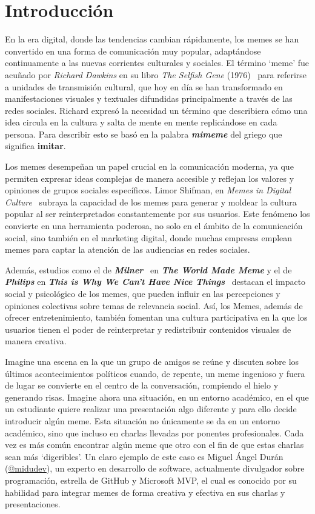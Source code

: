 \chapter{Introducción}

En la era digital, donde las tendencias cambian rápidamente, los memes se han convertido en una forma de comunicación muy popular, adaptándose continuamente a las nuevas corrientes culturales y sociales. El término `meme' fue acuñado por \textit{Richard Dawkins} en su libro \textit{The Selfish Gene} (1976)~\cite{dawkins2016selfish} para referirse a unidades de transmisión cultural, que hoy en día se han transformado en manifestaciones visuales y textuales difundidas principalmente a través de las redes sociales. Richard expresó la necesidad un término que describiera cómo una idea circula en la cultura y salta de mente en mente replicándose en cada persona. Para describir esto se basó en la palabra \textit{\textbf{mimeme}} del griego que significa \textbf{imitar}.

Los memes desempeñan un papel crucial en la comunicación moderna, ya que permiten expresar ideas complejas de manera accesible y reflejan los valores y opiniones de grupos sociales específicos. Limor Shifman, en \textit{Memes in Digital Culture}~\cite{lehman2016memes} subraya la capacidad de los memes para generar y moldear la cultura popular al ser reinterpretados constantemente por sus usuarios. Este fenómeno los convierte en una herramienta poderosa, no solo en el ámbito de la comunicación social, sino también en el marketing digital, donde muchas empresas emplean memes para captar la atención de las audiencias en redes sociales.

Además, estudios como el de \textit{\textbf{Milner}}~\cite{milner2018world} en \textit{\textbf{The World Made Meme}} y el de \textit{\textbf{Philips}} en \textit{\textbf{This is Why We Can't Have Nice Things}}~\cite{phillips2015we} destacan el impacto social y psicológico de los memes, que pueden influir en las percepciones y opiniones colectivas sobre temas de relevancia social. Así, los Memes, además de ofrecer entretenimiento, también fomentan una cultura participativa en la que los usuarios tienen el poder de reinterpretar y redistribuir contenidos visuales de manera creativa.

Imagine una escena en la que un grupo de amigos se reúne y discuten sobre los últimos acontecimientos políticos cuando, de repente, un meme ingenioso y fuera de lugar se convierte en el centro de la conversación, rompiendo el hielo y generando risas. Imagine ahora una situación, en un entorno académico, en el que un estudiante quiere realizar una presentación algo diferente y para ello decide introducir algún meme. Esta situación no únicamente se da en un entorno académico, sino que incluso en charlas llevadas por ponentes profesionales. Cada vez es más común encontrar algún meme que otro con el fin de que estas charlas sean más `digeribles'. Un claro ejemplo de este caso es Miguel Ángel Durán (\href{https://midu.dev/}{@midudev}), un experto en desarrollo de software, actualmente divulgador sobre programación, estrella de GitHub y Microsoft MVP, el cual es conocido por su habilidad para integrar memes de forma creativa y efectiva en sus charlas y presentaciones.

